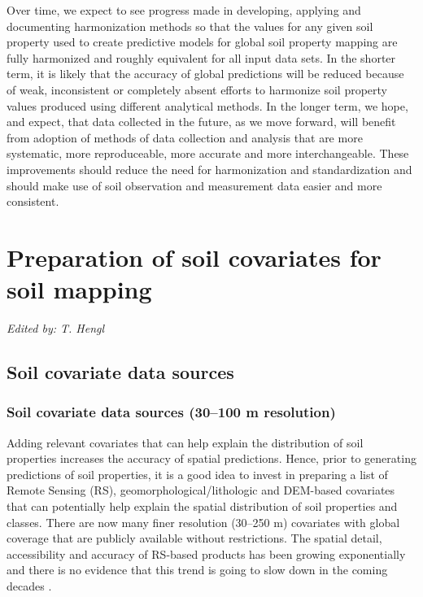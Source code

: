 \documentclass[11pt]{krantz}
\theoremstyle{definition}
\theoremstyle{definition}
\theoremstyle{definition}
\theoremstyle{remark}
\begin{document}
Over time, we expect to see progress made in developing, applying and
documenting harmonization methods so that the values for any given soil
property used to create predictive models for global soil property
mapping are fully harmonized and roughly equivalent for all input data
sets. In the shorter term, it is likely that the accuracy of global
predictions will be reduced because of weak, inconsistent or completely
absent efforts to harmonize soil property values produced using
different analytical methods. In the longer term, we hope, and expect,
that data collected in the future, as we move forward, will benefit from
adoption of methods of data collection and analysis that are more
systematic, more reproduceable, more accurate and more interchangeable.
These improvements should reduce the need for harmonization and
standardization and should make use of soil observation and measurement
data easier and more consistent.

\hypertarget{soil-covs-chapter}{%
\chapter{Preparation of soil covariates for soil
mapping}\label{soil-covs-chapter}}

\emph{Edited by: T. Hengl}

\hypertarget{soil-covariate-data-sources}{%
\section{Soil covariate data
sources}\label{soil-covariate-data-sources}}

\hypertarget{soil-covs-30m}{%
\subsection{Soil covariate data sources (30--100 m
resolution)}\label{soil-covs-30m}}

Adding relevant covariates that can help explain the distribution of
soil properties increases the accuracy of spatial predictions. Hence,
prior to generating predictions of soil properties, it is a good idea to
invest in preparing a list of Remote Sensing (RS),
geomorphological/lithologic and DEM-based covariates that can
potentially help explain the spatial distribution of soil properties and
classes. There are now many finer resolution (30--250 m) covariates with
global coverage that are publicly available without restrictions. The
spatial detail, accessibility and accuracy of RS-based products has been
growing exponentially and there is no evidence that this trend is going
to slow down in the coming decades \citep{Herold2016}.
\end{document}
